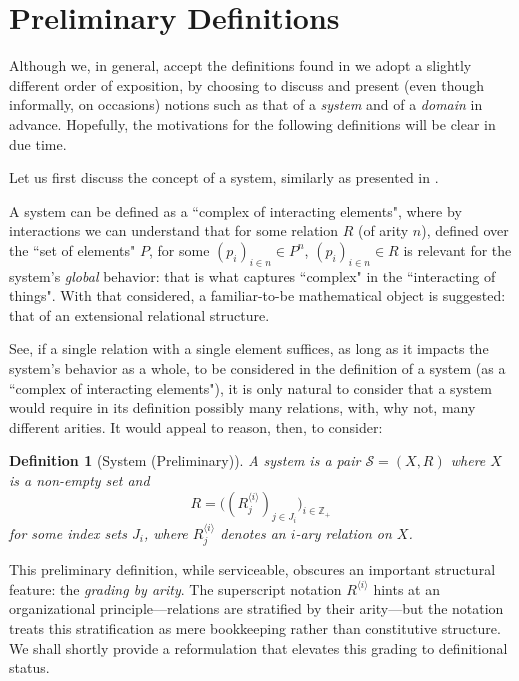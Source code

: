 \documentclass[12pt,a4paper]{article}
\newtheorem{definition}{Definition}[section]
\begin{document}
\section{Preliminary Definitions}

Although we, in general, accept the definitions found in \citet{guarino2009} we adopt a slightly different order of exposition, by choosing to discuss and present (even though informally, on occasions) notions such as that of a \textit{system} and of a \textit{domain} in advance. Hopefully, the motivations for the following definitions will be clear in due time.

Let us first discuss the concept of a system, similarly as presented in \citet{bertalanffy1968}.

A system can be defined as a ``complex of interacting elements", where by interactions we can understand that for some relation $R$ (of arity $n$), defined over the ``set of elements" $P$, for some $(p_i)_{i \in n} \in P^n$, $(p_i)_{i \in n} \in R$ is relevant for the system's \textit{global} behavior: that is what captures ``complex" in the ``interacting of things". With that considered, a familiar-to-be mathematical object is suggested: that of an extensional relational structure.

See, if a single relation with a single element suffices, as long as it impacts the system's behavior as a whole, to be considered in the definition of a system (as a ``complex of interacting elements"), it is only natural to consider that a system would require in its definition possibly many relations, with, why not, many different arities. It would appeal to reason, then, to consider:

\begin{definition}[System (Preliminary)]
\label{def:system-prelim}
A \textit{system} is a pair $\mathcal{S} = (X, R)$ where $X$ is a non-empty set and
$$
R = \big((R^{\langle i \rangle}_j)_{j\in J_i}\big)_{i\in \mathbb{Z}_+}
$$
for some index sets $J_i$, where $R^{\langle i \rangle}_j$ denotes an $i$-ary relation on $X$.
\end{definition}

This preliminary definition, while serviceable, obscures an important structural feature: the \emph{grading by arity}. The superscript notation $R^{\langle i \rangle}$ hints at an organizational principle---relations are stratified by their arity---but the notation treats this stratification as mere bookkeeping rather than constitutive structure. We shall shortly provide a reformulation that elevates this grading to definitional status.
\end{document}
